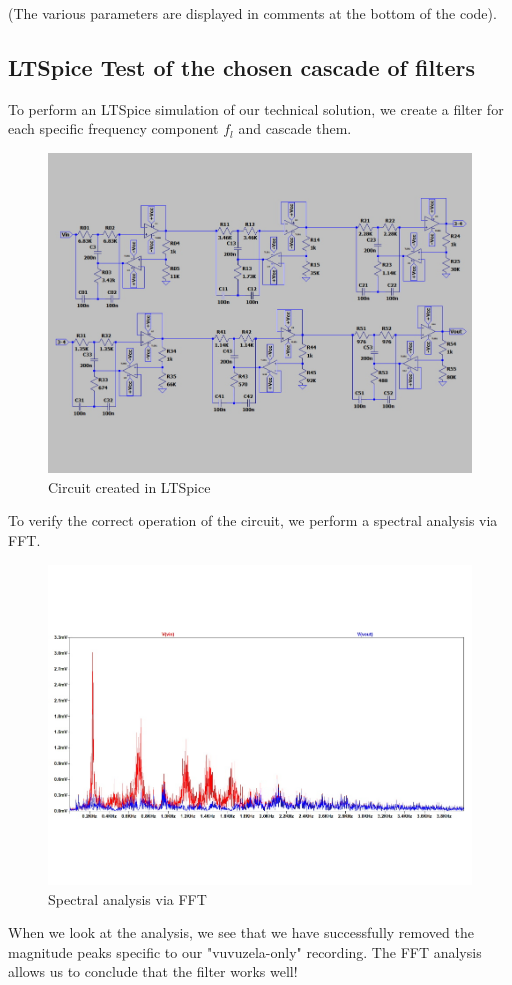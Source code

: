 (The various parameters are displayed in comments at the bottom of the code).


\subsection{LTSpice Test of the chosen cascade of filters}
To perform an LTSpice simulation of our technical solution, we create a filter for each specific frequency component $f_l$ and cascade them.

\begin{figure}[H]
  \centering
  \includegraphics[width=0.7\linewidth]{img/LTSpice_circuit.jpg}
  \caption{Circuit created in LTSpice}
\end{figure}

\newpage
To verify the correct operation of the circuit, we perform a spectral analysis via FFT.
\begin{figure}[H]
  \centering
  \includegraphics[width=0.7\linewidth]{img/fft_analysis.jpg}
  \caption{Spectral analysis via FFT}
\end{figure}

When we look at the analysis, we see that we have successfully removed the magnitude peaks specific to our "vuvuzela-only" recording. The FFT analysis allows us to conclude that the filter works well!

